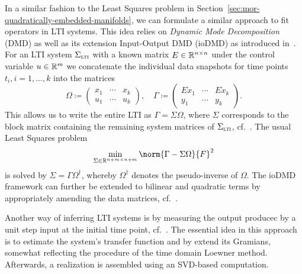 In a similar fashion to the Least Squares problem in Section~\ref{sec:mor-quadratically-embedded-manifolds}, we can formulate a similar approach to fit operators in LTI systems.
This idea relies on \emph{Dynamic Mode Decomposition} (DMD) as well as its extension Input-Output DMD (ioDMD) as introduced in~\cite{Annoni2016}.
For an LTI system $\Sigma_{\textnormal{\scshape lti}}$ with a known matrix $E \in \mathbb{R}^{n \times n}$ under the control variable $u \in \mathbb{R}^m$ we concatenate the individual data snapshots for time points $t_i, i = 1, \dots, k$ into the matrices
\begin{equation}\label{eq:iodmd-data-matrices}
    \Omega \coloneqq \begin{pmatrix}
        x_1 & \cdots & x_k \\
        u_1 & \cdots & u_k
    \end{pmatrix},\quad \Gamma \coloneqq \begin{pmatrix}
        E \dot{x}_1 & \cdots & E \dot{x}_k \\
        y_1 & \cdots & y_k
    \end{pmatrix}.
\end{equation}
This allows us to write the entire LTI as $\Gamma = \Sigma \Omega$, where $\Sigma$ corresponds to the block matrix containing the remaining system matrices of $\Sigma_{\textnormal{\scshape lti}}$, cf.~\cite{Heiland2022}.
The usual Least Squares problem
\begin{equation*}
    \min\limits_{\Sigma \in \bb{R}^{n + m \times n + m}} \norm{\Gamma - \Sigma \Omega}{F}^2
\end{equation*}
is solved by $\Sigma = \Gamma \Omega^\dagger$, whereby $\Omega^\dagger$ denotes the pseudo-inverse of $\Omega$.
The ioDMD framework can further be extended to bilinear and quadratic terms by appropriately amending the data matrices, cf.~\cite{Gosea2021}.


Another way of inferring LTI systems is by measuring the output producec by a unit step input at the initial time point, cf.~\cite{Miller2012}.
The essential idea in this approach is to estimate the system's transfer function and by extend its Gramians, somewhat reflecting the procedure of the time domain Loewner method.
Afterwards, a realization is assembled using an SVD-based computation.

